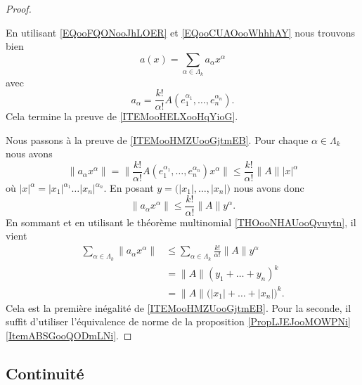 \begin{proof}
\begin{subproof}
		\spitem[Et enfin]
		En utilisant \eqref{EQooFQONooJhLOER} et \eqref{EQooCUAOooWhhhAY} nous trouvons bien
		\begin{equation}
			a(x)=\sum_{\alpha\in \Lambda_k}a_{\alpha}x^{\alpha}
		\end{equation}
		avec
		\begin{equation}
			a_{\alpha}=\frac{ k! }{ \alpha! }A(e_1^{\alpha_1},\ldots,e_n^{\alpha_n}).
		\end{equation}
		Cela termine la preuve de \ref{ITEMooHELXooHqYioG}.
	\end{subproof}
	Nous passons à la preuve de \ref{ITEMooHMZUooGjtmEB}. Pour chaque \( \alpha\in\Lambda_k\) nous avons
	\begin{equation}
		\| a_{\alpha}x^{\alpha} \|=\| \frac{ k! }{ \alpha! }A(e_1^{\alpha_1},\ldots,e_n^{\alpha_n})x^{\alpha} \|\leq \frac{ k! }{ \alpha! }\| A \|| x |^{\alpha}
	\end{equation}
	où \( | x |^{\alpha}=| x_1 |^{\alpha_1}\ldots | x_n |^{\alpha_n}\). En posant \( y=\big( | x_1 |,\ldots,| x_n | \big)\) nous avons donc
	\begin{equation}
		\| a_{\alpha}x^{\alpha} \|\leq \frac{ k! }{ \alpha! }\| A \|y^{\alpha}.
	\end{equation}
	En sommant et en utilisant le théorème multinomial \ref{THOooNHAUooQvuytn}, il vient
	\begin{subequations}
		\begin{align}
			\sum_{\alpha\in \Lambda_k}\| a_{\alpha}x^{\alpha} \| & \leq \sum_{\alpha\in\Lambda_k}\frac{ k! }{ \alpha! }\| A \|y^{\alpha} \\
			                                                     & =\| A \|(y_1+\ldots+y_n)^k                                            \\
			                                                     & =\| A \|\big( | x_1 |+\ldots+| x_n | \big)^k.
		\end{align}
	\end{subequations}
	Cela est la première inégalité de \ref{ITEMooHMZUooGjtmEB}. Pour la seconde, il suffit d'utiliser l'équivalence de norme de la proposition \ref{PropLJEJooMOWPNi}\ref{ItemABSGooQODmLNi}.
\end{proof}


\subsection{Continuité}


